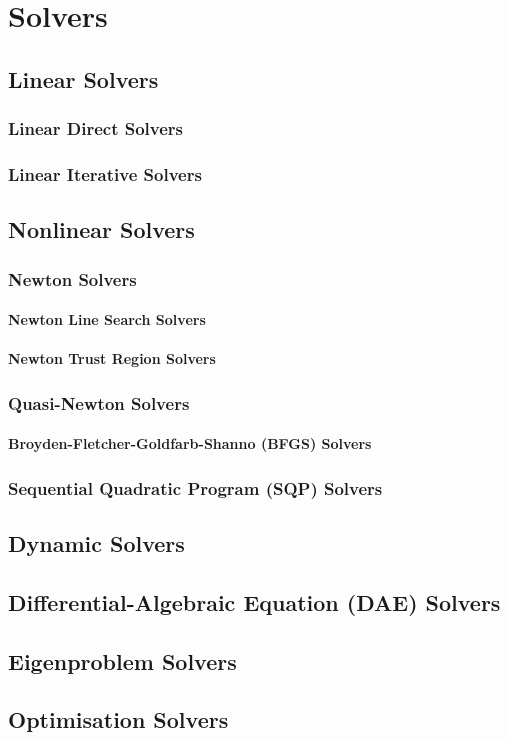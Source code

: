 \clearemptydoublepage
\chapter{Solvers}
\label{cha:solvers}

\section{Linear Solvers}

\subsection{Linear Direct Solvers}

\subsection{Linear Iterative Solvers}

\section{Nonlinear Solvers}

\subsection{Newton Solvers}

\subsubsection{Newton Line Search Solvers}

\subsubsection{Newton Trust Region Solvers}

\subsection{Quasi-Newton Solvers}

\subsubsection{Broyden-Fletcher-Goldfarb-Shanno (BFGS) Solvers}

\subsection{Sequential Quadratic Program (SQP) Solvers}

\section{Dynamic Solvers}

\section{Differential-Algebraic Equation (DAE) Solvers }

\section{Eigenproblem Solvers}

\section{Optimisation Solvers}
